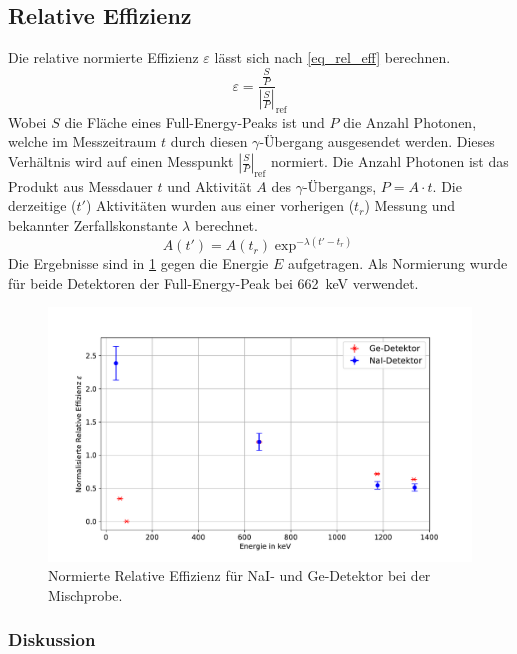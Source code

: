 \documentclass[
	a4paper,
	12pt,
	pagesize,
	ngerman
]{scrartcl}
\begin{document}
\subsection{Relative Effizienz}
Die relative normierte Effizienz $\varepsilon$ lässt sich nach \cref{eq_rel_eff} berechnen.
\begin{equation}
	\label{eq_rel_eff}
	\varepsilon = \frac{\frac{S}{P}}{\left|\frac{S}{P}\right|}_{\text{ref}}
\end{equation}
Wobei $S$ die Fläche eines Full-Energy-Peaks ist und $P$ die Anzahl Photonen, welche im Messzeitraum $t$ durch diesen $\gamma$-Übergang ausgesendet werden.
Dieses Verhältnis wird auf einen Messpunkt $\left|\frac{S}{P}\right|_{\text{ref}}$ normiert.
Die Anzahl Photonen ist das Produkt aus Messdauer $t$ und Aktivität $A$ des $\gamma$-Übergangs, $P=A\cdot t$.
Die derzeitige ($t'$) Aktivitäten wurden aus einer vorherigen ($t_r$) Messung und bekannter Zerfallskonstante $\lambda$ berechnet.
\begin{equation}
	A(t') = A(t_r)\exp^{-\lambda (t'-t_r)}
\end{equation}
Die Ergebnisse sind in \cref{fg_eff} gegen die Energie $E$ aufgetragen.
Als Normierung wurde für beide Detektoren der Full-Energy-Peak bei \SI{662}{keV} verwendet.

	\begin{figure}[H]
			\includegraphics[width= 1 \linewidth]{img/eff}
			\caption{
			Normierte Relative Effizienz für NaI- und Ge-Detektor bei der Mischprobe.
			}
			\label{fg_eff}
	\end{figure}

\subsubsection{Diskussion}
\end{document}
